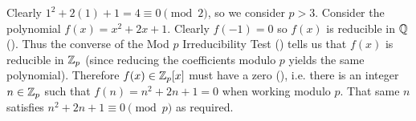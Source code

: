 \begin{questions}
    \item Clearly $1^2 + 2(1) + 1 = 4 \equiv 0 \pmod2$, so we consider $p > 3$. Consider the polynomial $f(x) = x^2 + 2x + 1$. Clearly $f(-1) = 0$ so $f(x)$ is reducible in $\mathbb{Q}$ (). Thus the converse of the Mod $p$ Irreducibility Test () tells us that $f(x)$ is reducible in $\mathbb{Z}_p$ (since reducing the coefficients modulo $p$ yields the same polynomial). Therefore $f(x) \in \mathbb{Z}_p[x]$ must have a zero (), i.e. there is an integer $n \in \mathbb{Z}_p$ such that $f(n) = n^2 + 2n + 1 = 0$ when working modulo $p$. That same $n$ satisfies $n^2 + 2n + 1 \equiv 0 \pmod{p}$ as required.
\end{questions}
